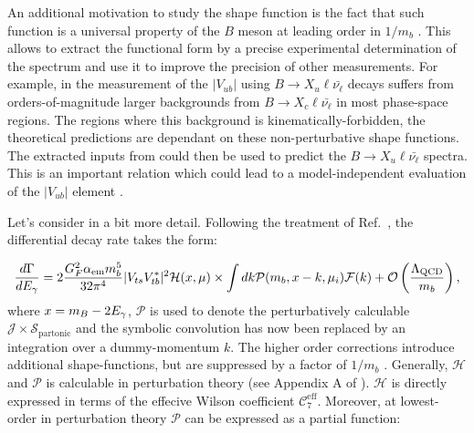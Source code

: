 An additional motivation to study the shape function is the fact that such function is a universal property of the $B$ meson at leading order in $1/m_b$ \cite{Neubert:1993um,Bigi:1993ex}.
This allows to extract the functional form by a precise experimental determination of the \BtoXsgamma spectrum and use it to improve the precision of other measurements.
For example, in the measurement of the $|V_{ub}|$ using $B\rightarrow X_u \ell \bar{\nu_{\ell}}$ decays suffers from orders-of-magnitude larger backgrounds from $B\rightarrow X_c \ell \bar{\nu_{\ell}}$ in most phase-space regions.
The regions where this background is kinematically-forbidden, the theoretical predictions are dependant on these non-perturbative shape functions.
The extracted inputs from \BtoXsgamma could then be used to predict the $B\rightarrow X_u \ell \bar{\nu_{\ell}}$ spectra.
This is an important relation which could lead to a model-independent evaluation of the $|V_{ub}|$ element \cite{Neubert:1993um}.

Let's consider  in a bit more detail.
Following the treatment of Ref.~\cite{Ligeti:2008ac}, the differential decay rate takes the form:

\begin{equation}\label{eq:differential_decay_simba}
    \frac{d\Gamma}{dE_{\gamma}} = 2\frac{G_F^2\alpha_{\mathrm{em}} m_b^5}{32\pi^4}|V_{ts}V_{tb}^*|^2 \mathcal{H}(x, \mu) \times \int dk \mathcal{P}(m_b, x - k, \mu_i) \mathcal{F}(k) + {\cal O}\left(\frac{\Lambda_{\mathrm{QCD}}}{m_b}\right),
\end{equation}
where $x=m_B-2{E_{\gamma}}$, $\mathcal{P}$ is used to denote the perturbatively calculable $\mathcal{J}\times\mathcal{S_{\mathrm{partonic}}}$ and the symbolic convolution has now been replaced by an integration over a dummy-momentum $k$.
The higher order corrections introduce additional shape-functions, but are suppressed by a factor of $1/m_b$ \cite{Neubert:2002yx}.
Generally, $\mathcal{H}$ and $\mathcal{P}$ is calculable in perturbation theory (see Appendix A of \cite{Ligeti:2008ac}).
$\mathcal{H}$ is directly expressed in terms of the effecive Wilson coefficient $\mathcal{C}_7^{\mathrm{eff}}$. 
Moreover, at lowest-order in perturbation theory $\mathcal{P}$ can be expressed as a partial function:

